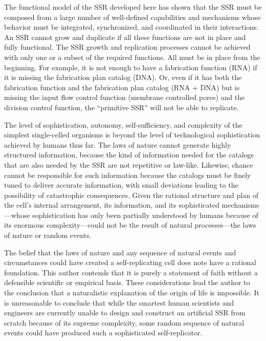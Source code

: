 The functional model of the SSR developed here has shown
that the SSR must be composed from a large number of well-defined
capabilities and mechanisms whose behavior must be integrated, synchronized, and
coordinated in their interactions. An SSR cannot grow and duplicate if 
all these functions are not in place and fully functional. The SSR growth
and replication processes cannot be achieved with only one or a subset of the
required functions.  All must be in place from the beginning.
For example, it is not enough to have a fabrication function (RNA) if it
is missing the fabrication plan catalog (DNA). Or, even if it has both
the fabrication function and the fabrication plan catalog (RNA + DNA)
but is missing the input flow control function (membrane controlled
pores) and the division control function, the ``primitive SSR'' will not
be able to replicate.

The level of sophistication, autonomy,
self-sufficiency, and complexity of the simplest single-celled organisms is beyond the level of technological
sophistication achieved by humans thus far. 
The laws of nature cannot generate highly structured information, because
the kind of information needed for the catalogs that are also needed by the SSR are
not repetitive or law-like.  Likewise, chance cannot be responsible for
such information because the catalogs must be finely tuned to deliver
accurate information, with small deviations leading to the possibility of
catastrophic consequences.
Given the rational structure and plan of the cell's internal
arrangement, its information, and its sophisticated
mechanisms---whose sophistication has only been partially
understood by humans because of its enormous complexity---could not be the
result of natural processes---the laws of nature or random events.

The belief that the laws of
nature and any sequence of natural events and circumstances
could have created a self-replicating cell does note have a rational
foundation.  This author contends that it is purely a statement of faith without a defensible
scientific or empirical basis.
These considerations lead the author to the conclusion that a naturalistic
explanation of the origin of life is impossible.
It is unreasonable to conclude that while the smartest
human scientists and engineers are currently unable to design and
construct an artificial SSR from scratch because of its supreme
complexity, some random sequence of natural events could have produced
such a sophisticated self-replicator.


